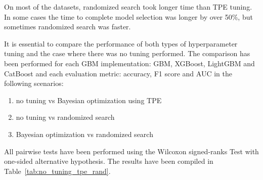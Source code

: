 \documentclass[magisterska, english]{pwr_wmat_praca_dyplomowa}
\theoremstyle{plain}
\numberwithin{theorem}{chapter}
\theoremstyle{definition}
\numberwithin{theorem}{chapter}
\newcommand{\gbm}{GBM, XGBoost, LightGBM and CatBoost }
\begin{document}
On most of the datasets, randomized search took longer time than TPE tuning. In some cases the time to complete model selection was longer by over 50\%, but sometimes randomized search was faster. 

It is essential to compare the performance of both types of hyperparameter tuning and the case where there was no tuning performed. The comparison has been performed for each GBM implementation: \gbm and each evaluation metric: accuracy, F1 score and AUC in the following scenarios:

\begin{enumerate}
    \item no tuning vs Bayesian optimization using TPE
    \item no tuning vs randomized search
    \item Bayesian optimization vs randomized search
\end{enumerate}

All pairwise tests have been performed using the Wilcoxon signed-ranks Test with one-sided alternative hypothesis. The results have been compiled in Table~\ref{tab:no_tuning_tpe_rand}.
\end{document}
